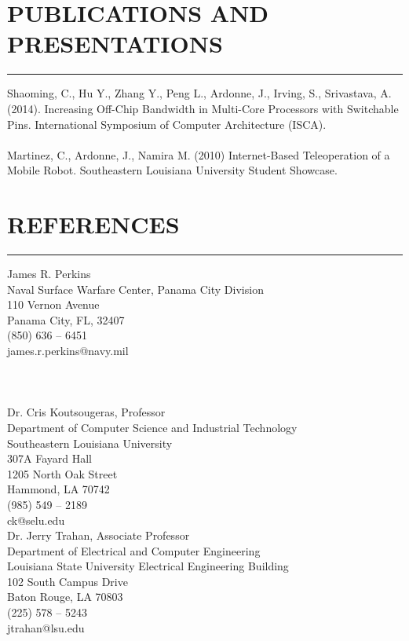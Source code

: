\documentclass{res}
\begin{document}
\begin{resume}
\section{PUBLICATIONS AND PRESENTATIONS}
	\vspace{0.005in}	
	\rule{\textwidth}{0.5pt}
	Shaoming, C., Hu Y., Zhang Y., Peng L., Ardonne, J., Irving, S., Srivastava, A. (2014). Increasing Off-Chip Bandwidth in Multi-Core Processors with Switchable Pins. International Symposium of Computer Architecture (ISCA).\\\\
	Martinez, C., Ardonne, J., Namira M. (2010) Internet-Based Teleoperation of a Mobile Robot. Southeastern Louisiana University Student Showcase.
	    
	   
\section{REFERENCES}
	\vspace{0.005in}	
	\rule{\textwidth}{0.5pt}
	\begin{multicols}{2}
		James R. Perkins\\
		Naval Surface Warfare Center, Panama City Division\\
		110 Vernon Avenue \\
		Panama City, FL, 32407 \\
		(850) 636 – 6451 \\
		james.r.perkins@navy.mil\\
		\\\\\\
		Dr. Cris Koutsougeras, Professor \\
		Department of Computer Science and Industrial Technology \\
		Southeastern Louisiana University \\
		307A Fayard Hall \\
		1205 North Oak Street \\
		Hammond, LA 70742 \\
		(985) 549 – 2189 \\
		ck@selu.edu\\
		
		Dr. Jerry Trahan, Associate Professor \\
		Department of Electrical and Computer Engineering \\
		Louisiana State University Electrical Engineering Building \\
		102 South Campus Drive \\
		Baton Rouge, LA 70803 \\
		(225) 578 – 5243 \\
		jtrahan@lsu.edu
		

\end{multicols}
\end{resume}
\end{document}
